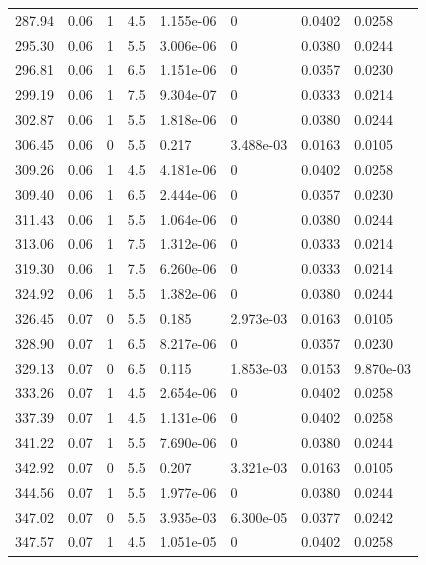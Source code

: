 \documentclass[preview]{standalone}
\begin{document}
{{{\begin{tabular}{L{1.2cm}C{1.2cm} C{0.3cm}C{0.5cm} C{1.4cm}C{1.4cm} C{1.4cm}C{1.4cm}}
  287.94  &  0.06  & 1     & 4.5 &  1.155e-06  & 0  & 0.0402 &  0.0258   \\ 
  295.30  &  0.06  & 1     & 5.5 &  3.006e-06  & 0  & 0.0380 &  0.0244   \\ 
  296.81  &  0.06  & 1     & 6.5 &  1.151e-06  & 0  & 0.0357 &  0.0230   \\ 
  299.19  &  0.06  & 1     & 7.5 &  9.304e-07  & 0  & 0.0333 &  0.0214   \\ 
  302.87  &  0.06  & 1     & 5.5 &  1.818e-06  & 0  & 0.0380 &  0.0244   \\ 
  306.45  &  0.06  & 0     & 5.5 &  0.217  & 3.488e-03  & 0.0163 &  0.0105   \\ 
  309.26  &  0.06  & 1     & 4.5 &  4.181e-06  & 0  & 0.0402 &  0.0258   \\ 
  309.40  &  0.06  & 1     & 6.5 &  2.444e-06  & 0  & 0.0357 &  0.0230   \\ 
  311.43  &  0.06  & 1     & 5.5 &  1.064e-06  & 0  & 0.0380 &  0.0244   \\ 
  313.06  &  0.06  & 1     & 7.5 &  1.312e-06  & 0  & 0.0333 &  0.0214   \\ 
  319.30  &  0.06  & 1     & 7.5 &  6.260e-06  & 0  & 0.0333 &  0.0214   \\ 
  324.92  &  0.06  & 1     & 5.5 &  1.382e-06  & 0  & 0.0380 &  0.0244   \\ 
  326.45  &  0.07  & 0     & 5.5 &  0.185  & 2.973e-03  & 0.0163 &  0.0105   \\ 
  328.90  &  0.07  & 1     & 6.5 &  8.217e-06  & 0  & 0.0357 &  0.0230   \\ 
  329.13  &  0.07  & 0     & 6.5 &  0.115  & 1.853e-03  & 0.0153 &  9.870e-03   \\ 
  333.26  &  0.07  & 1     & 4.5 &  2.654e-06  & 0  & 0.0402 &  0.0258   \\ 
  337.39  &  0.07  & 1     & 4.5 &  1.131e-06  & 0  & 0.0402 &  0.0258   \\ 
  341.22  &  0.07  & 1     & 5.5 &  7.690e-06  & 0  & 0.0380 &  0.0244   \\ 
  342.92  &  0.07  & 0     & 5.5 &  0.207  & 3.321e-03  & 0.0163 &  0.0105   \\ 
  344.56  &  0.07  & 1     & 5.5 &  1.977e-06  & 0  & 0.0380 &  0.0244   \\ 
  347.02  &  0.07  & 0     & 5.5 &  3.935e-03  & 6.300e-05  & 0.0377 &  0.0242   \\ 
  347.57  &  0.07  & 1     & 4.5 &  1.051e-05  & 0  & 0.0402 &  0.0258   \\ 

\end{tabular}}}}
\end{document}
